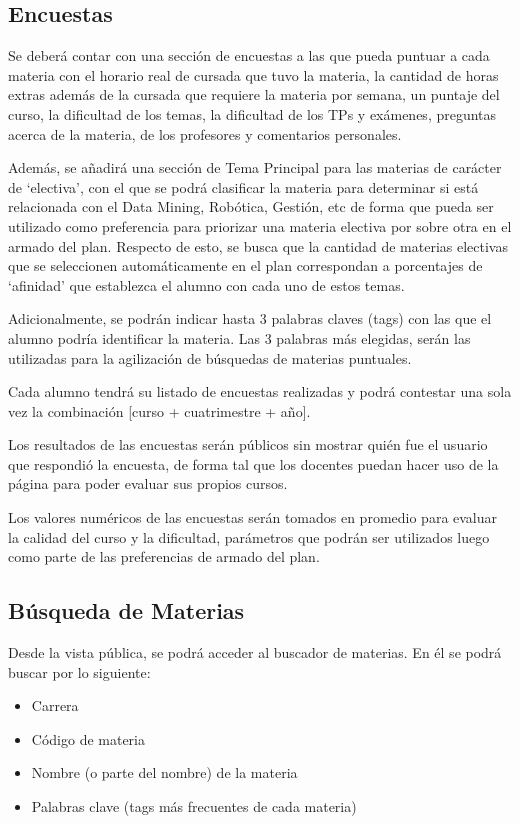 \documentclass[a4paper]{article}
\begin{document}
\subsection{Encuestas}

Se deberá contar con una sección de encuestas a las que pueda puntuar a cada materia con el horario real de cursada que tuvo la materia, la cantidad de horas extras además de la cursada que requiere la materia por semana, un puntaje del curso, la dificultad de los temas, la dificultad de los TPs y exámenes, preguntas acerca de la materia, de los profesores y comentarios personales.

Además, se añadirá una sección de Tema Principal para las materias de carácter de `electiva', con el que se podrá clasificar la materia para determinar si está relacionada con el Data Mining, Robótica, Gestión, etc de forma que pueda ser utilizado como preferencia para priorizar una materia electiva por sobre otra en el armado del plan. Respecto de esto, se busca que la cantidad de materias electivas que se seleccionen automáticamente en el plan correspondan a porcentajes de `afinidad' que establezca el alumno con cada uno de estos temas.

Adicionalmente, se podrán indicar hasta 3 palabras claves (tags) con las que el alumno podría identificar la materia. Las 3 palabras más elegidas, serán las utilizadas para la agilización de búsquedas de materias puntuales.

Cada alumno tendrá su listado de encuestas realizadas y podrá contestar una sola vez la combinación [curso + cuatrimestre + año].

Los resultados de las encuestas serán públicos sin mostrar quién fue el usuario que respondió la encuesta, de forma tal que los docentes puedan hacer uso de la página para poder evaluar sus propios cursos.

Los valores numéricos de las encuestas serán tomados en promedio para evaluar la calidad del curso y la dificultad, parámetros que podrán ser utilizados luego como parte de las preferencias de armado del plan.

\subsection{Búsqueda de Materias}

Desde la vista pública, se podrá acceder al buscador de materias. En él se podrá buscar por lo siguiente:

\begin{itemize}
	\item Carrera
	\item Código de materia
	\item Nombre (o parte del nombre) de la materia
	\item Palabras clave (tags más frecuentes de cada materia)
\end{itemize}
\end{document}
